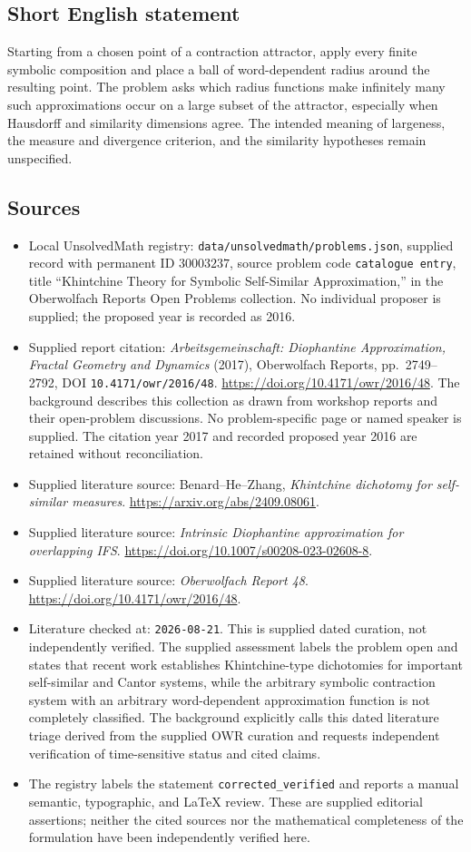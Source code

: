\documentclass[11pt]{article}
\begin{document}
\subsection{Short English statement}
Starting from a chosen point of a contraction attractor, apply every finite symbolic composition and place a ball of word-dependent radius around the resulting point. The problem asks which radius functions make infinitely many such approximations occur on a large subset of the attractor, especially when Hausdorff and similarity dimensions agree. The intended meaning of largeness, the measure and divergence criterion, and the similarity hypotheses remain unspecified.
\subsection{Sources}
\begin{itemize}
\item Local UnsolvedMath registry: \texttt{data/unsolvedmath/problems.json}, supplied record with permanent ID \(30003237\), source problem code \texttt{catalogue entry}, title ``Khintchine Theory for Symbolic Self-Similar Approximation,'' in the Oberwolfach Reports Open Problems collection. No individual proposer is supplied; the proposed year is recorded as 2016.
\item Supplied report citation: \emph{Arbeitsgemeinschaft: Diophantine Approximation, Fractal Geometry and Dynamics} (2017), Oberwolfach Reports, pp.\ 2749--2792, DOI \texttt{10.4171/owr/2016/48}. \url{https://doi.org/10.4171/owr/2016/48}. The background describes this collection as drawn from workshop reports and their open-problem discussions. No problem-specific page or named speaker is supplied. The citation year 2017 and recorded proposed year 2016 are retained without reconciliation.
\item Supplied literature source: Benard--He--Zhang, \emph{Khintchine dichotomy for self-similar measures}. \url{https://arxiv.org/abs/2409.08061}.
\item Supplied literature source: \emph{Intrinsic Diophantine approximation for overlapping IFS}. \url{https://doi.org/10.1007/s00208-023-02608-8}.
\item Supplied literature source: \emph{Oberwolfach Report 48}. \url{https://doi.org/10.4171/owr/2016/48}.
\item Literature checked at: \texttt{2026-08-21}. This is supplied dated curation, not independently verified. The supplied assessment labels the problem open and states that recent work establishes Khintchine-type dichotomies for important self-similar and Cantor systems, while the arbitrary symbolic contraction system with an arbitrary word-dependent approximation function is not completely classified. The background explicitly calls this dated literature triage derived from the supplied OWR curation and requests independent verification of time-sensitive status and cited claims.
\item The registry labels the statement \texttt{corrected\_verified} and reports a manual semantic, typographic, and LaTeX review. These are supplied editorial assertions; neither the cited sources nor the mathematical completeness of the formulation have been independently verified here.
\end{itemize}
\end{document}
